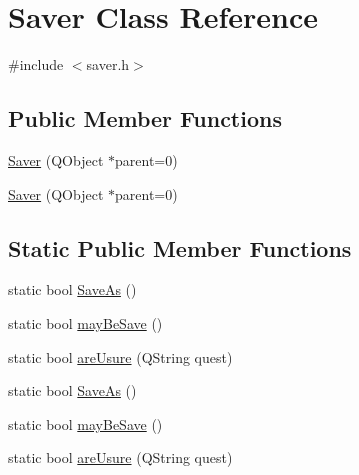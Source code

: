 \hypertarget{class_saver}{
\section{Saver Class Reference}
\label{class_saver}
}


{\ttfamily \#include $<$saver.h$>$}

\subsection*{Public Member Functions}
\begin{DoxyCompactItemize}
\item 
\hyperlink{class_saver_a7f1ef50c20315010bed17eb311c631ba}{Saver} (QObject $\ast$parent=0)
\item 
\hyperlink{class_saver_a7f1ef50c20315010bed17eb311c631ba}{Saver} (QObject $\ast$parent=0)
\end{DoxyCompactItemize}
\subsection*{Static Public Member Functions}
\begin{DoxyCompactItemize}
\item 
static bool \hyperlink{class_saver_a10e79f5ebc67c5259ad8595d3badf903}{SaveAs} ()
\item 
static bool \hyperlink{class_saver_a28cafa1b6311df5573407f77724c25a6}{mayBeSave} ()
\item 
static bool \hyperlink{class_saver_aa6aab13c5d47a3b67fc0f7b7f87aa1eb}{areUsure} (QString quest)
\item 
static bool \hyperlink{class_saver_ae818b23ae217a2f3f72e34553c275306}{SaveAs} ()
\item 
static bool \hyperlink{class_saver_a31f51e5cb85535996d840654af62cfce}{mayBeSave} ()
\item 
static bool \hyperlink{class_saver_a4a9a585a8af1c48d7899554964b74a40}{areUsure} (QString quest)
\end{DoxyCompactItemize}


